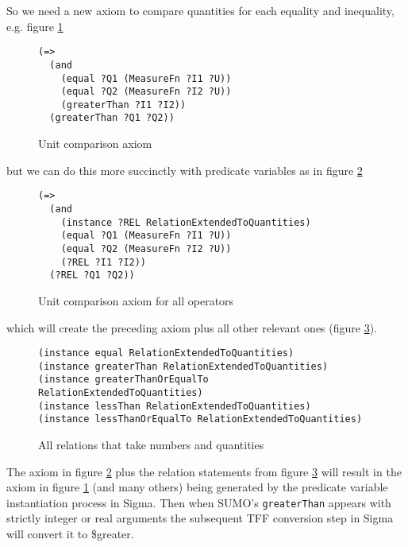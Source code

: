 \documentclass{article}
\begin{document}
So we need a new axiom to compare quantities for each equality and inequality, e.g.
figure \ref{fig:UnitCompare}

\begin{figure}[H]
\begin{framed}
\begin{verbatim}
(=>
  (and
    (equal ?Q1 (MeasureFn ?I1 ?U))
    (equal ?Q2 (MeasureFn ?I2 ?U))
    (greaterThan ?I1 ?I2))
  (greaterThan ?Q1 ?Q2))
\end{verbatim}
\end{framed}
\caption{Unit comparison axiom}
\label{fig:UnitCompare}
\end{figure}

but we can do this more succinctly with predicate variables as in figure \ref{fig:UnitCompareAll}

\begin{figure}[H]
\begin{framed}
\begin{verbatim}
(=>
  (and
    (instance ?REL RelationExtendedToQuantities)
    (equal ?Q1 (MeasureFn ?I1 ?U))
    (equal ?Q2 (MeasureFn ?I2 ?U))
    (?REL ?I1 ?I2))
  (?REL ?Q1 ?Q2))
\end{verbatim}
\end{framed}
\caption{Unit comparison axiom for all operators}
\label{fig:UnitCompareAll}
\end{figure}

which will create the preceding axiom plus all other relevant ones (figure
\ref{fig:AllRel}).

\begin{figure}[H]
\begin{framed}
\begin{verbatim}  
(instance equal RelationExtendedToQuantities)   
(instance greaterThan RelationExtendedToQuantities)
(instance greaterThanOrEqualTo RelationExtendedToQuantities)   
(instance lessThan RelationExtendedToQuantities)   
(instance lessThanOrEqualTo RelationExtendedToQuantities) 
\end{verbatim}
\end{framed}
\caption{All relations that take numbers and quantities}
\label{fig:AllRel}
\end{figure}

The axiom in figure \ref{fig:UnitCompareAll} plus the relation statements from
figure \ref{fig:AllRel} will result in the axiom in figure \ref{fig:UnitCompare}
(and many others) being generated by the predicate variable instantiation
process in Sigma.  Then when SUMO's \texttt{greaterThan} appears with strictly
integer or real arguments the subsequent TFF conversion step in Sigma will
convert it to \$greater.
\end{document}

